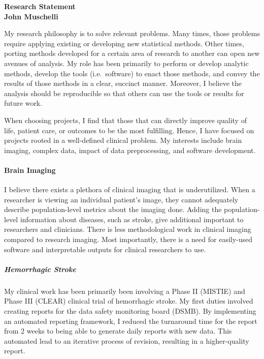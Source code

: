 \documentclass[12pt,a4paper]{article}
\author{John Muschelli}
\begin{document}
\thispagestyle{empty}

\begin{center}
{\bf
{\large Research Statement }\\
John Muschelli
}
\end{center}

My research philosophy is to solve relevant problems.  Many times, those problems require applying existing or developing new statistical methods.  Other times, porting methods developed for a certain area of research to another can open new avenues of analysis.  My role has been primarily to perform or develop analytic methods, develop the tools (i.e.~software) to enact those methods, and convey the results of those methods in a clear, succinct manner.  Moreover, I believe the analysis should be reproducible so that others can use the tools or results for future work.

When choosing projects, I find that those that can directly improve quality of life, patient care, or outcomes to be the most fulfilling.  Hence, I have focused on projects rooted in a well-defined clinical problem.  My interests include brain imaging, complex data, impact of data preprocessing, and software development.  

\paragraph{Brain Imaging} I believe there exists a plethora of clinical imaging that is underutilized.   When a researcher is viewing an individual patient's image, they cannot adequately describe population-level metrics about the imaging done.  Adding the population-level information about diseases, such as stroke, give additional important to researchers and clinicians.  There is less methodological work in clinical imaging compared to research imaging.  Most importantly, there is a need for easily-used software and interpretable outputs for clinical researchers to use.

\subparagraph{Hemorrhagic Stroke} My clinical work has been primarily been involving a Phase II (MISTIE) and Phase III (CLEAR) clinical trial of hemorrhagic stroke.  My first duties involved creating reports for the data safety monitoring board (DSMB).  By implementing an automated reporting framework, I reduced the turnaround time for the report from 2 weeks to being able to generate daily reports with new data.  This automated lead to an iterative process of revision, resulting in a higher-quality report.  
\end{document}
